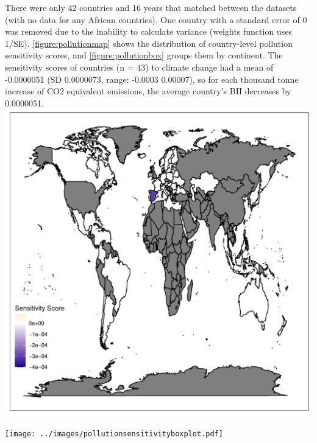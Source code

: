 \documentclass[11pt, a4paper, titlepage]{article}
\begin{document}
	There were only 42 countries and 16 years that matched between the datasets (with no data for any African countries). One country with a standard error of 0 was removed due to the inability to calculate variance (weights function uses 1/SE). \autoref{figure:pollutionmap} shows the distribution of country-level pollution sensitivity scores, and \autoref{figure:pollutionbox} groups them by continent. The sensitivity scores of countries (n = 43) to climate change had a mean of -0.0000051 (SD 0.0000073, range: -0.0003  0.00007), so for each thousand tonne increase of CO2 equivalent emissions, the average country's BII decreases by 0.0000051.\newline
	\includegraphics[scale=0.95]{../images/pollutionsensitivitymapgradient.pdf}
	\label{figure:pollutionmap}
	
	\texttt{[image: ../images/pollutionsensitivityboxplot.pdf]}
	\label{figure:pollutionbox}
	
\end{document}
